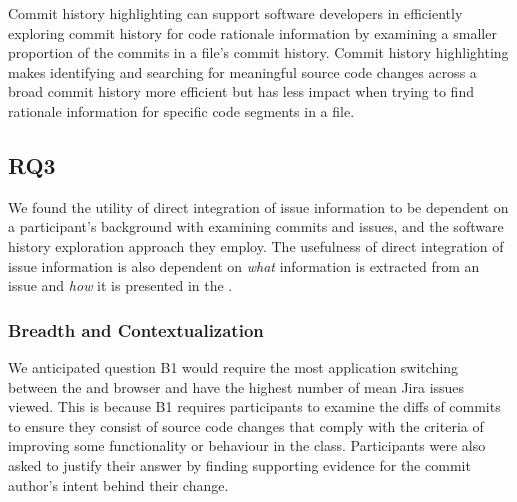 \begin{summary}[RQ2]
  Commit history highlighting can support software developers in efficiently 
  exploring commit history for code rationale information 
  by examining a smaller proportion of the commits in a file's commit history.
  Commit history highlighting makes identifying and searching for meaningful source code changes 
  across a broad commit history more efficient but has less impact when trying to find rationale information for specific code segments in a file.
\end{summary}


\subsection{RQ3}
\label{subsec:RQ3}


We found the utility of direct integration of issue information 
to be dependent on a participant's background with examining commits and issues,
and the software history exploration approach they employ.
The usefulness of direct integration of issue information is also dependent on 
\emph{what} information is extracted from an issue and \emph{how} it is presented in the .

\subsubsection{Breadth and Contextualization}

We anticipated question B1 would require the most application switching between the  
and browser and have the highest number of mean Jira issues viewed.
This is because B1 requires participants to examine the diffs of commits to ensure they consist of source code changes 
that comply with the criteria of improving some functionality or behaviour in the  class.
Participants were also asked to justify their answer by finding supporting evidence for the commit author's intent behind their change.

